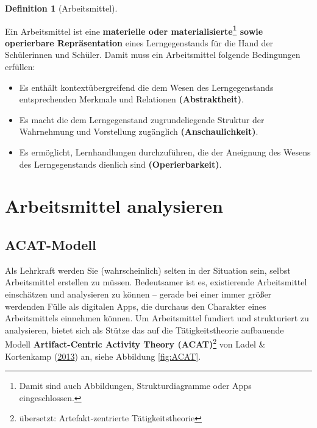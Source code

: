 \documentclass[
]{scrbook}
\providecommand{\tightlist}{%
  \setlength{\itemsep}{0pt}\setlength{\parskip}{0pt}}
\theoremstyle{definition}
\newtheorem{definition}{Definition}[chapter]
\theoremstyle{definition}
\theoremstyle{definition}
\theoremstyle{definition}
\theoremstyle{remark}
\begin{document}
\begin{definition}[Arbeitsmittel]
\protect\hypertarget{def:Arbeitsmittel}{}\label{def:Arbeitsmittel}

Ein Arbeitsmittel ist eine \textbf{materielle oder materialisierte\footnote{Damit sind auch Abbildungen, Strukturdiagramme oder Apps eingeschlossen.} sowie operierbare Repräsentation} eines Lerngegenstands für die Hand der Schülerinnen und Schüler. Damit muss ein Arbeitsmittel folgende Bedingungen erfüllen:

\begin{itemize}
\tightlist
\item
  Es enthält kontextübergreifend die dem Wesen des Lerngegenstands entsprechenden Merkmale und Relationen \textbf{(Abstraktheit)}.
\item
  Es macht die dem Lerngegenstand zugrundeliegende Struktur der Wahrnehmung und Vorstellung zugänglich \textbf{(Anschaulichkeit)}.
\item
  Es ermöglicht, Lernhandlungen durchzuführen, die der Aneignung des Wesens des Lerngegenstands dienlich sind \textbf{(Operierbarkeit)}.
\end{itemize}

\end{definition}

\hypertarget{arbeitsmittel-analysieren}{%
\section{Arbeitsmittel analysieren}\label{arbeitsmittel-analysieren}}

\hypertarget{acat-modell}{%
\subsection{ACAT-Modell}\label{acat-modell}}

Als Lehrkraft werden Sie (wahrscheinlich) selten in der Situation sein, selbst Arbeitsmittel erstellen zu müssen. Bedeutsamer ist es, existierende Arbeitsmittel einschätzen und analysieren zu können --
gerade bei einer immer größer werdenden Fülle als digitalen Apps, die durchaus den Charakter eines Arbeitsmittels einnehmen können. Um Arbeitsmittel fundiert und strukturiert zu analysieren, bietet sich als Stütze das auf die Tätigkeitstheorie aufbauende Modell \textbf{Artifact-Centric Activity Theory (ACAT)}\footnote{übersetzt: Artefakt-zentrierte Tätigkeitstheorie} von Ladel \& Kortenkamp (\protect\hyperlink{ref-Ladel2013}{2013}) an, siehe Abbildung \ref{fig:ACAT}.
\end{document}
